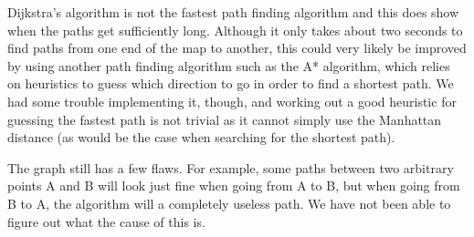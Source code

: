 Dijkstra's algorithm is not the fastest path finding algorithm and this does show when the paths get sufficiently long. Although it only takes about two seconds to find paths from one end of the map to another, this could very likely be improved by using another path finding algorithm such as the A* algorithm, which relies on heuristics to guess which direction to go in order to find a shortest path. We had some trouble implementing it, though, and working out a good heuristic for guessing the fastest path is not trivial as it cannot simply use the Manhattan distance (as would be the case when searching for the shortest path).

The graph still has a few flaws. For example, some paths between two arbitrary points A and B will look just fine when going from A to B, but when going from B to A, the algorithm will a completely useless path. We have not been able to figure out what the cause of this is.